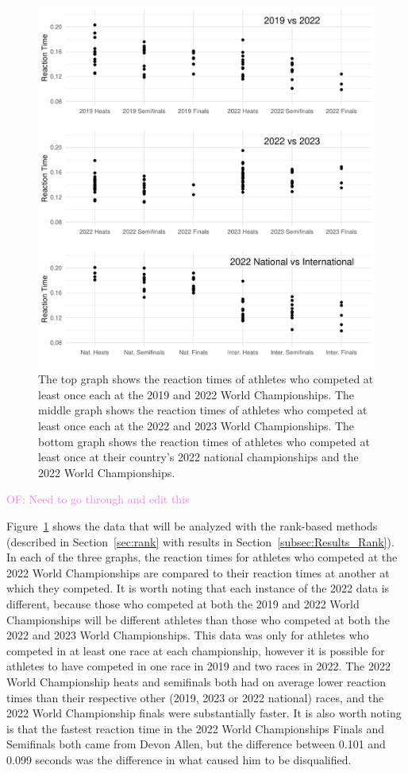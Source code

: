 \documentclass[12pt, letterpaper]{article}
\newcommand{\of}[1]{\textcolor{violet}{OF: #1}}
\begin{document}
\begin{figure}[tbp]
  \centering
  \includegraphics{RankScatterPlots}
  \caption{The top graph shows the reaction times of athletes who competed at 
	least once each at the 2019 and 2022 World Championships. The middle graph 
	shows the reaction times of athletes who competed at least once each at the 
	2022 and 2023 World Championships. The bottom graph shows the reaction times 
	of athletes who competed at least once at their country's
  2022 national championships and the 2022 World Championships.}
  \label{fig:RankScatterplots}
\end{figure}
\of{Need to go through and edit this}

Figure~\ref{fig:RankScatterplots} shows the data that will be analyzed
with the rank-based methods (described in Section~\ref{sec:rank} with results in 
Section~\ref{subsec:Results_Rank}). In each of the three graphs, the reaction 
times for athletes who competed at the 2022 World Championships
are compared to their reaction times at another at which they competed. 
It is worth noting that each instance of the 2022 data is different, because
those who competed at both the 2019 and 2022 World Championships will be
different athletes than those who competed at both the 2022 and 2023 World
Championships. This data was only for athletes who competed
in at least one race at each championship, however it is possible for athletes
to have competed in one race in 2019 and two races in 2022. The 2022 World
Championship heats and semifinals both had on average lower reaction times than
their respective other (2019, 2023 or 2022 national) races, and the 2022 World 
Championship finals were substantially faster.  It
is also worth noting is that the fastest reaction time in the 2022 World
Championships Finals and Semifinals both came from Devon Allen, but the 
difference between 0.101 and 0.099
seconds was the difference in what caused him to be disqualified. 
\end{document}
